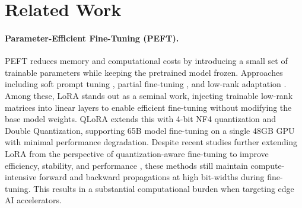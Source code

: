 \section{Related Work}
\label{related_works}
\vspace{-2mm}

\paragraph{Parameter-Efficient Fine-Tuning (PEFT).} PEFT reduces memory and computational costs by introducing a small set of trainable parameters while keeping the pretrained model frozen. Approaches including soft prompt tuning \citep{wang2023multitask}, partial fine-tuning \citep{fu2023effectiveness}, and low-rank adaptation \citep{hu2021lora}. Among these, LoRA stands out as a seminal work, injecting trainable low-rank matrices into linear layers to enable efficient fine-tuning without modifying the base model weights. QLoRA extends this with 4-bit NF4 quantization and Double Quantization, supporting 65B model fine-tuning on a single 48GB GPU with minimal performance degradation. Despite recent studies further extending LoRA from the perspective of quantization-aware fine-tuning \citep{xu2023qa, liloftq} to improve efficiency, stability, and performance \citep{hu2023llmadapters,liu2024dora, zhao2024galore,hayou2024lora+,meng2024pissa}, these methods still maintain compute-intensive forward and backward propagations at high bit-widths during fine-tuning. This results in a substantial computational burden when targeting edge AI accelerators.


